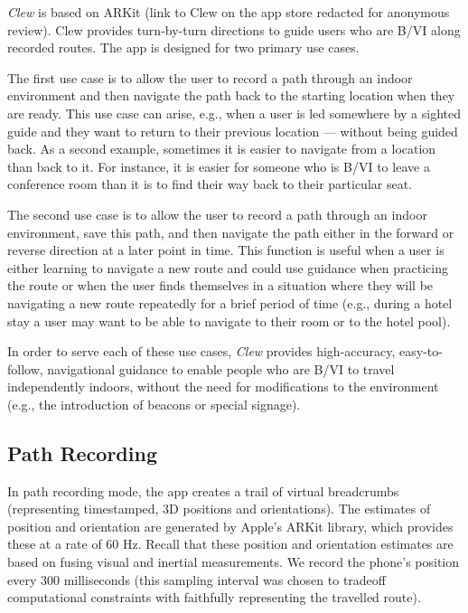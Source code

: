 \documentclass[chi_draft]{sigchi}
\newcommand{\BVI}{B/VI\xspace}
\begin{document}
\emph{Clew} is based on ARKit (link to Clew on the app store redacted for anonymous review).  Clew provides turn-by-turn directions to guide users who are \BVI along recorded routes.  The app is designed for two primary use cases.

The first use case is to allow the user to record a path through an indoor environment and then navigate the path back to the starting location when they are ready.  This use case can arise, e.g., when a user is led somewhere by a sighted guide and they want to return to their previous location --- without being guided back.  As a second example, sometimes it is easier to navigate from a location than back to it.  For instance, it is easier for someone who is \BVI to leave a conference room than it is to find their way back to their particular seat.

The second use case is to allow the user to record a path through an indoor environment, save this path, and then navigate the path either in the forward or reverse direction at a later point in time.  This function is useful when a user is either learning to navigate a new route and could use guidance when practicing the route or when the user finds themselves in a situation where they will be navigating a new route repeatedly for a brief period of time (e.g., during a hotel stay a user may want to be able to navigate to their room or to the hotel pool).

In order to serve each of these use cases, \emph{Clew} provides high-accuracy, easy-to-follow, navigational guidance to enable people who are \BVI to travel independently indoors, without the need for modifications to the environment (e.g., the introduction of beacons or special signage).  

\subsection{Path Recording}

In path recording mode, the app creates a trail of virtual breadcrumbs (representing timestamped, 3D positions and orientations).  The estimates of position and orientation are generated by Apple's ARKit library, which provides these at a rate of 60 Hz.  Recall that these position and orientation estimates are based on fusing visual and inertial measurements.  We record the phone's position every $300$ milliseconds (this sampling interval was chosen to tradeoff computational constraints with faithfully representing the travelled route).
\end{document}
